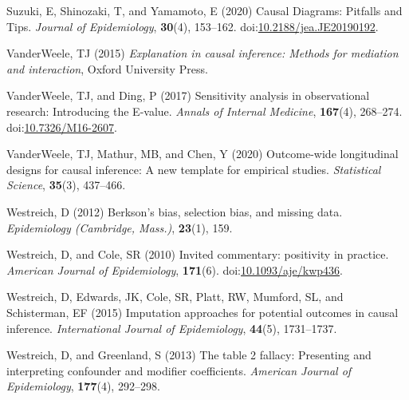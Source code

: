 \documentclass[
  singlecolumn]{article}
\newlength{\cslhangindent}
\newenvironment{CSLReferences}[2] %
 {\begin{list}{}{%
  \setlength{\itemindent}{0pt}
  \setlength{\leftmargin}{0pt}
  \setlength{\parsep}{0pt}
  \ifodd #1
   \setlength{\leftmargin}{\cslhangindent}
   \setlength{\itemindent}{-1\cslhangindent}
  \fi
  \setlength{\itemsep}{#2\baselineskip}}}
 {\end{list}}
\begin{document}
\begin{CSLReferences}{1}{0}
Suzuki, E, Shinozaki, T, and Yamamoto, E (2020) Causal Diagrams:
Pitfalls and Tips. \emph{Journal of Epidemiology}, \textbf{30}(4),
153--162.
doi:\href{https://doi.org/10.2188/jea.JE20190192}{10.2188/jea.JE20190192}.

VanderWeele, TJ (2015) \emph{Explanation in causal inference: Methods
for mediation and interaction}, Oxford University Press.

VanderWeele, TJ, and Ding, P (2017) Sensitivity analysis in
observational research: Introducing the {E}-value. \emph{Annals of
Internal Medicine}, \textbf{167}(4), 268--274.
doi:\href{https://doi.org/10.7326/M16-2607}{10.7326/M16-2607}.

VanderWeele, TJ, Mathur, MB, and Chen, Y (2020) Outcome-wide
longitudinal designs for causal inference: A new template for empirical
studies. \emph{Statistical Science}, \textbf{35}(3), 437--466.

Westreich, D (2012) Berkson's bias, selection bias, and missing data.
\emph{Epidemiology (Cambridge, Mass.)}, \textbf{23}(1), 159.

Westreich, D, and Cole, SR (2010) Invited commentary: positivity in
practice. \emph{American Journal of Epidemiology}, \textbf{171}(6).
doi:\href{https://doi.org/10.1093/aje/kwp436}{10.1093/aje/kwp436}.

Westreich, D, Edwards, JK, Cole, SR, Platt, RW, Mumford, SL, and
Schisterman, EF (2015) Imputation approaches for potential outcomes in
causal inference. \emph{International Journal of Epidemiology},
\textbf{44}(5), 1731--1737.

Westreich, D, and Greenland, S (2013) The table 2 fallacy: Presenting
and interpreting confounder and modifier coefficients. \emph{American
Journal of Epidemiology}, \textbf{177}(4), 292--298.

\end{CSLReferences}
\end{document}
